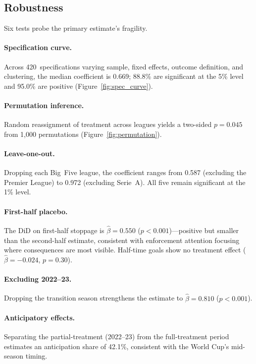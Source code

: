 \subsection{Robustness}
\label{subsec:robustness}

Six tests probe the primary estimate's fragility.

\paragraph{Specification curve.} Across 420~specifications varying
sample, fixed effects, outcome definition, and clustering, the median
coefficient is 0.669; 88.8\% are significant at the 5\% level and
95.0\% are positive (Figure~\ref{fig:spec_curve}).

\paragraph{Permutation inference.} Random reassignment of treatment
across leagues yields a two-sided $p = 0.045$ from 1,000 permutations
(Figure~\ref{fig:permutation}).

\paragraph{Leave-one-out.} Dropping each Big~Five league, the
coefficient ranges from 0.587 (excluding the Premier League) to 0.972
(excluding Serie~A). All five remain significant at the 1\% level.

\paragraph{First-half placebo.} The DiD on first-half stoppage is
$\hat{\beta} = 0.550$ ($p < 0.001$)---positive but smaller than the
second-half estimate, consistent with enforcement attention focusing
where consequences are most visible. Half-time goals show no
treatment effect ($\hat{\beta} = -0.024$, $p = 0.30$).

\paragraph{Excluding 2022--23.} Dropping the transition season
strengthens the estimate to $\hat{\beta} = 0.810$ ($p < 0.001$).

\paragraph{Anticipatory effects.} Separating the partial-treatment
(2022--23) from the full-treatment period estimates an anticipation
share of 42.1\%, consistent with the World Cup's mid-season timing.

